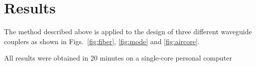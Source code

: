 \documentclass[letterpaper,10pt]{article}
\begin{document}
\section{Results}
The method described above is applied to 
    the design of three different waveguide couplers
    as shown in Figs.~\ref{fig:fiber}, \ref{fig:mode} and \ref{fig:aircore}.

All results were obtained in 20 minutes on a single-core personal computer


\end{document}
